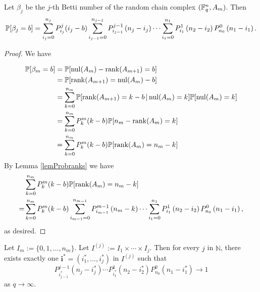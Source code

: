 
\begin{theorem} Let $\beta_j$ be the $j$-th Betti number of the random chain complex $(\mathbb{F}_q^{n} , A_m)$. Then
	\[    
    \mathbb{P}[\beta_j = b] = \sum_{i_j=0}^{n_{j}} P_{i_j}^{j}(i_j-b)
    \sum_{i_{j-1}=0}^{n_{j-1}} P_{i_{j-1}}^{j-1}\left(n_{j} -i_j\right)
		\cdots
	\sum_{i_1 = 0}^{n_1} P_{i_1}^1\left(n_2 - i_2\right) P_{n_0}^0 \left(n_1 - i_1\right).
    \]
\end{theorem}

\begin{proof}
We have

\begin{align*}
  \mathbb{P}[\beta_{m} = b] 
   &= \mathbb{P}[\mathrm{nul}(A_{m}) - \operatorname{\mathrm{rank}}(A_{m+1}) = b]\\
   &= \mathbb{P}[\operatorname{\mathrm{rank}}(A_{m+1}) = \mathrm{nul}(A_{m}) - b]\\
   &= \sum_{k=0}^{n_{m}}\mathbb{P}[\operatorname{\mathrm{rank}}(A_{m+1}) = k - b\,|\, \mathrm{nul}(A_{m})=k] \mathbb{P}[\mathrm{nul}(A_{m}) = k]\\
   &= \sum_{k=0}^{n_{m}} P_{k}^{m}(k-b)\mathbb{P}[n_{m} - \operatorname{\mathrm{rank}}(A_{m}) = k]\\
   &= \sum_{k=0}^{n_{m}} P_{k}^{m}(k-b)\mathbb{P}[\operatorname{\mathrm{rank}}(A_{m}) = n_{m} - k]\\ 
\end{align*}
By Lemma \ref{lemProbranks} we have
\begin{align*}
 & \sum_{k=0}^{n_{m}} P_{k}^{m}(k-b)\mathbb{P}[\operatorname{\mathrm{rank}}(A_{m}) = n_{m} - k] \\
=& \sum_{k=0}^{n_{m}} P_{k}^{m}(k-b)\sum_{i_{m-1}=0}^{n_{m-1}} P_{i_{m-1}}^{m-1}\left(n_{m} -k\right)
		\cdots
	\sum_{i_1 = 0}^{n_1} P_{i_1}^1\left(n_2 - i_2\right) P_{n_0}^0 \left(n_1 - i_1\right), 
\end{align*}
as desired.
\end{proof}

\begin{lemma}
Let $I_m:= \{0,1,\ldots, n_m\}$.  Let $I^{(j)}:= I_1\times\cdots \times I_j$.  Then for every $j$ in $\mathbb{N}$, there exists exactly one $\mathbf{i}^\ast = (i_1^\ast,\ldots, i_j^\ast)$ in $I^{(j)}$ such that 
\[
P_{i_{j-1}^\ast}^{j-1}(n_j-i_j^\ast)\cdots P_{i_1^\ast}^1(n_2-i_2^\ast)P_{n_0}^0(n_1-i_1^\ast) \to 1
\]
as $q\to\infty$.
\end{lemma}

